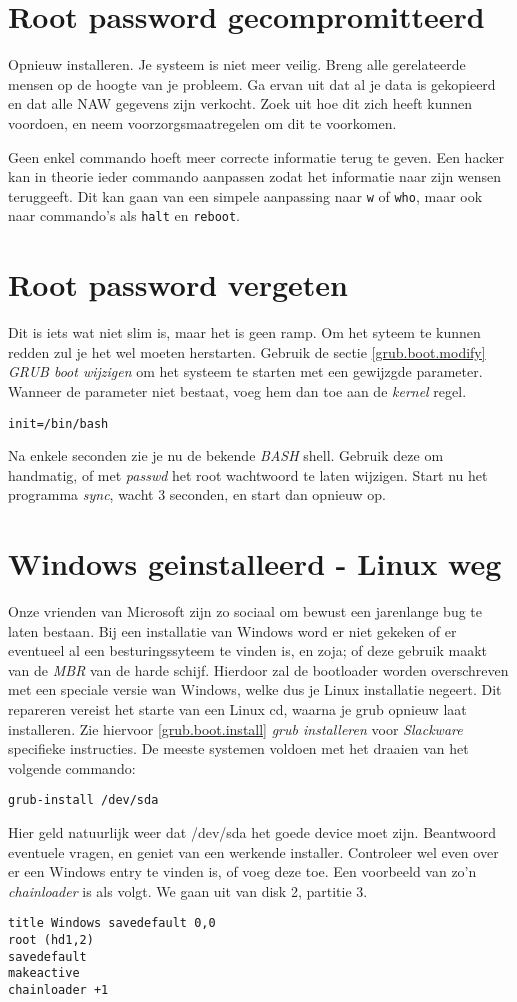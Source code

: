 \section{Root password gecompromitteerd}
Opnieuw installeren. Je systeem is niet meer veilig. Breng alle gerelateerde mensen op de hoogte van je probleem. Ga ervan uit dat al je data is gekopieerd en dat alle NAW gegevens zijn verkocht. Zoek uit hoe dit zich heeft kunnen voordoen, en neem voorzorgsmaatregelen om dit te voorkomen. 

Geen enkel commando hoeft meer correcte informatie terug te geven. Een hacker kan in theorie ieder commando aanpassen zodat het informatie naar zijn wensen teruggeeft. Dit kan gaan van een simpele aanpassing naar \texttt{w} of \texttt{who}, maar ook naar commando's als \texttt{halt} en \texttt{reboot}.

\section{Root password vergeten}
Dit is iets wat niet slim is, maar het is geen ramp. Om het syteem te kunnen redden zul je het wel moeten herstarten. Gebruik de sectie \ref{grub.boot.modify} \emph{GRUB boot wijzigen} om het systeem te starten met een gewijzgde parameter. Wanneer de parameter niet bestaat, voeg hem dan toe aan de \emph{kernel} regel. 
\begin{lstlisting}
init=/bin/bash
\end{lstlisting}
Na enkele seconden zie je nu de bekende \emph{BASH} shell. Gebruik deze om handmatig, of met \emph{passwd} het root wachtwoord te laten wijzigen. Start nu het programma \emph{sync}, wacht 3 seconden, en start dan opnieuw op. 

\section{Windows geinstalleerd - Linux weg}
Onze vrienden van Microsoft zijn zo sociaal om bewust een jarenlange bug te laten bestaan. Bij een installatie van Windows word er niet gekeken of er eventueel al een besturingssyteem te vinden is, en zoja; of deze gebruik maakt van de \emph{MBR} van de harde schijf. Hierdoor zal de bootloader worden overschreven met een speciale versie wan Windows, welke dus je Linux installatie negeert. Dit repareren vereist het starte van een Linux cd, waarna je grub opnieuw laat installeren. Zie hiervoor \ref{grub.boot.install} \emph{grub installeren} voor \emph{Slackware} specifieke instructies. De meeste systemen voldoen met het draaien van het volgende commando:
\begin{lstlisting}
grub-install /dev/sda
\end{lstlisting}
Hier geld natuurlijk weer dat /dev/sda het goede device moet zijn. Beantwoord eventuele vragen, en geniet van een werkende installer. Controleer wel even over er een Windows entry te vinden is, of voeg deze toe. Een voorbeeld van zo'n \emph{chainloader} is als volgt. We gaan uit van disk 2, partitie 3.
\begin{lstlisting}
title Windows savedefault 0,0
root (hd1,2)
savedefault
makeactive
chainloader +1
\end{lstlisting}
